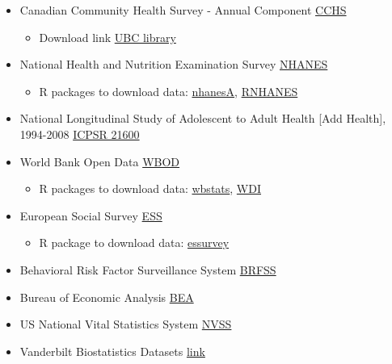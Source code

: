 \documentclass[
]{book}
\providecommand{\tightlist}{%
  \setlength{\itemsep}{0pt}\setlength{\parskip}{0pt}}
\begin{document}
\begin{itemize}
\tightlist
\item
  Canadian Community Health Survey - Annual Component \href{https://www150.statcan.gc.ca/n1/en/catalogue/11-625-X}{CCHS}

  \begin{itemize}
  \tightlist
  \item
    Download link \href{http://dvn.library.ubc.ca/}{UBC library}
  \end{itemize}
\item
  National Health and Nutrition Examination Survey \href{https://www.cdc.gov/nchs/nhanes/index.htm}{NHANES}

  \begin{itemize}
  \tightlist
  \item
    R packages to download data: \href{https://cran.r-project.org/web/packages/nhanesA/vignettes/Introducing_nhanesA.html}{nhanesA}, \href{https://cran.r-project.org/web/packages/RNHANES/vignettes/introduction.html}{RNHANES}
  \end{itemize}
\item
  National Longitudinal Study of Adolescent to Adult Health {[}Add Health{]}, 1994-2008 \href{http://www.icpsr.umich.edu/icpsrweb/DSDR/studies/21600}{ICPSR 21600}
\item
  World Bank Open Data \href{https://data.worldbank.org/}{WBOD}

  \begin{itemize}
  \tightlist
  \item
    R packages to download data: \href{https://cran.r-project.org/web/packages/wbstats/vignettes/Using_the_wbstats_package.html}{wbstats}, \href{https://cran.r-project.org/web/packages/WDI/index.html}{WDI}
  \end{itemize}
\item
  European Social Survey \href{http://www.europeansocialsurvey.org/}{ESS}

  \begin{itemize}
  \tightlist
  \item
    R package to download data: \href{https://cran.r-project.org/web/packages/essurvey/vignettes/intro_ess.html}{essurvey}
  \end{itemize}
\item
  Behavioral Risk Factor Surveillance System \href{https://www.cdc.gov/brfss/data_documentation/index.htm}{BRFSS}
\item
  Bureau of Economic Analysis \href{http://www.bea.gov/}{BEA}
\item
  US National Vital Statistics System \href{https://www.cdc.gov/nchs/nvss/vsrr.htm}{NVSS}
\item
  Vanderbilt Biostatistics Datasets \href{http://biostat.mc.vanderbilt.edu/wiki/Main/DataSets}{link}
\end{itemize}
\end{document}
